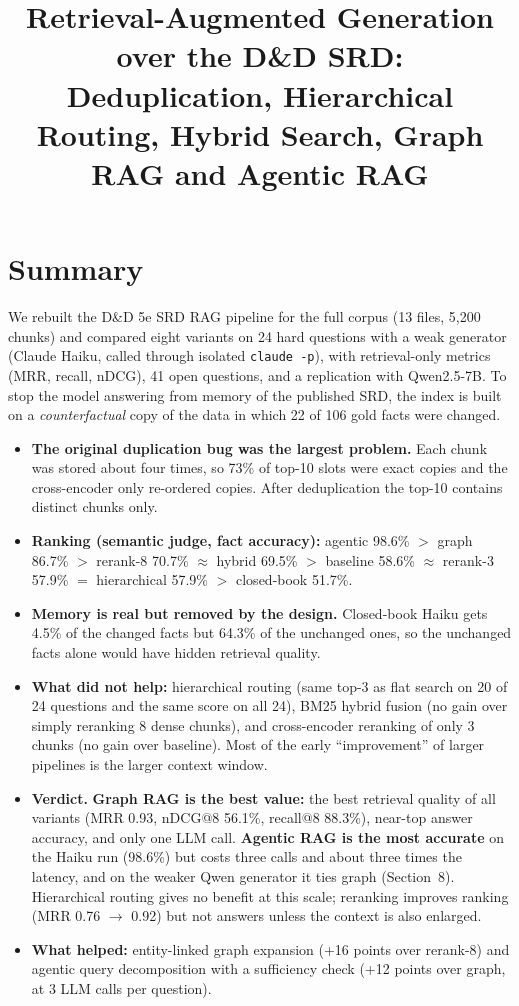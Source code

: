 \documentclass[11pt,a4paper]{article}
\title{Retrieval-Augmented Generation over the D\&D SRD:\\Deduplication, Hierarchical Routing, Hybrid Search, Graph RAG and Agentic RAG}
\author{}
\date{}
\begin{document}
\maketitle

\section{Summary}
We rebuilt the D\&D 5e SRD RAG pipeline for the full corpus (13 files, 5{,}200 chunks) and compared eight variants on 24 hard questions with a weak generator (Claude Haiku, called through isolated \texttt{claude -p}), with retrieval-only metrics (MRR, recall, nDCG), 41 open questions, and a replication with Qwen2.5-7B. To stop the model answering from memory of the published SRD, the index is built on a \emph{counterfactual} copy of the data in which 22 of 106 gold facts were changed.
\begin{itemize}
\item \textbf{The original duplication bug was the largest problem.} Each chunk was stored about four times, so 73\% of top-10 slots were exact copies and the cross-encoder only re-ordered copies. After deduplication the top-10 contains distinct chunks only.
\item \textbf{Ranking (semantic judge, fact accuracy):} agentic 98.6\% $>$ graph 86.7\% $>$ rerank-8 70.7\% $\approx$ hybrid 69.5\% $>$ baseline 58.6\% $\approx$ rerank-3 57.9\% $=$ hierarchical 57.9\% $>$ closed-book 51.7\%.
\item \textbf{Memory is real but removed by the design.} Closed-book Haiku gets 4.5\% of the changed facts but 64.3\% of the unchanged ones, so the unchanged facts alone would have hidden retrieval quality.
\item \textbf{What did not help:} hierarchical routing (same top-3 as flat search on 20 of 24 questions and the same score on all 24), BM25 hybrid fusion (no gain over simply reranking 8 dense chunks), and cross-encoder reranking of only 3 chunks (no gain over baseline). Most of the early ``improvement'' of larger pipelines is the larger context window.
\item \textbf{Verdict.} \textbf{Graph RAG is the best value:} the best retrieval quality of all variants (MRR 0.93, nDCG@8 56.1\%, recall@8 88.3\%), near-top answer accuracy, and only one LLM call. \textbf{Agentic RAG is the most accurate} on the Haiku run (98.6\%) but costs three calls and about three times the latency, and on the weaker Qwen generator it ties graph (Section~8). Hierarchical routing gives no benefit at this scale; reranking improves ranking (MRR 0.76 $\to$ 0.92) but not answers unless the context is also enlarged.
\item \textbf{What helped:} entity-linked graph expansion (+16 points over rerank-8) and agentic query decomposition with a sufficiency check (+12 points over graph, at 3 LLM calls per question).
\end{itemize}
\end{document}
